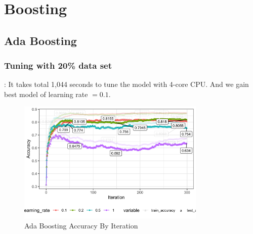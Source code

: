\documentclass[8pt]{beamer}
\begin{document}
\section{Boosting}
\subsection{Ada Boosting}
\subsubsection{Tuning with 20\% data set}
\begin{frame}[allowframebreaks]{\secname : \subsecname}{\subsubsecname}
It takes total 1,044 seconds to tune the model with 4-core CPU. And we gain best model of learning rate $=0.1$.	
\begin{figure}[htbp]
\centerline{\includegraphics[width=0.8\textwidth]{figure/Ada Boosting Accuracy By Iteration.png}}
\caption{Ada Boosting Accuracy By Iteration}
\label{Ada Boosting Accuracy By Iteration}
\vspace{-1.5em}
\end{figure}
\end{frame}
\end{document}

